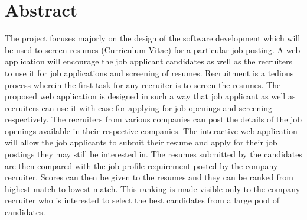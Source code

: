\documentclass[12 pt, oneside]{book}
\begin{document}
%
%
%
%

%
%
%
%
%
%
%
%

% 
%
%
%
%
% 
%
%
%
%
%
\chapter*{Abstract}
The project focuses majorly on the design of the software development which will be used to screen resumes (Curriculum Vitae) for a particular job posting. A web application will encourage the job applicant candidates as well as the recruiters to use it for job applications and screening of resumes. Recruitment is a tedious process wherein the first task for any recruiter is to screen the resumes. The proposed web application is designed in such a way that job applicant as well as recruiters can use it with ease for applying for job openings and screening respectively. The recruiters from various companies can post the details of the job openings available in their respective companies. The interactive web application will allow the job applicants to submit their resume and apply for their job postings they may still be interested in. The resumes submitted by the candidates are then compared with the job profile requirement posted by the company recruiter. Scores can then be given to the resumes and they can be ranked from highest match to lowest match. This ranking is made visible only to the company recruiter who is interested to select the best candidates from a large pool of candidates.
\end{document}
